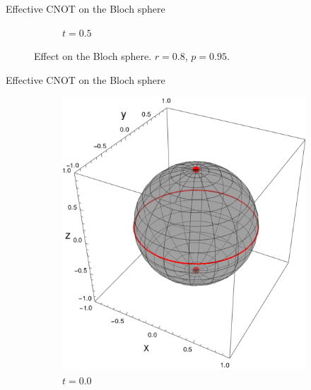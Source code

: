 \begin{frame}{Effective CNOT on the Bloch sphere}
\begin{figure}[h!]
\begin{subfigure}{0.32\textwidth}
            \caption{$t=0.5$}
        \end{subfigure}
        \caption{Effect on the Bloch sphere. $r=0.8$, $p=0.95$.}
    \end{figure}
\end{frame}

\begin{frame}{Effective CNOT on the Bloch sphere}
    \begin{figure}[h!]
        \centering
        \begin{subfigure}{0.32\textwidth}
            \centering
            \includegraphics[width=0.9\linewidth]{figures/sphere_CNOT_t=0.0_z=0.8_p=0.6.png}
            \caption{$t=0.0$}
        \end{subfigure}%
        \begin{subfigure}{0.32\textwidth}
            \centering

\end{subfigure}
\end{figure}
\end{frame}
